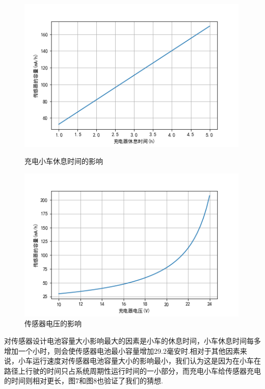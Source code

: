 \documentclass{whutmod}
\begin{document}
\begin{figure}[H]	
	\begin{minipage}[t]{0.48\textwidth}
		\centering
		\includegraphics[width=0.99\textwidth]{充电小车休息时间.png}	
		
		\caption{充电小车休息时间的影响}
	\end{minipage}
	\qquad
	\begin{minipage}[t]{0.48\textwidth}
		\centering
		\includegraphics[width=0.99\textwidth]{传感器电压.png}
		
		\caption{传感器电压的影响}	
	\end{minipage}
	\label{fig:enhance}
	
\end{figure}

对传感器设计电池容量大小影响最大的因素是小车的休息时间，小车休息时间每多增加一个小时，则会使传感器电池最小容量增加29.2毫安时.相对于其他因素来说，小车运行速度对传感器电池容量大小的影响最小，我们认为这是因为在小车在路径上行驶的时间只占系统周期性运行时间的一小部分，而充电小车给传感器充电的时间则相对更长，图7和图8也验证了我们的猜想.
\end{document}
